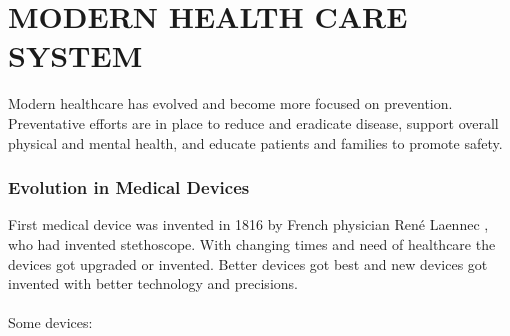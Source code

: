 \documentclass[12pt]{article}
\begin{document}
\section*{MODERN HEALTH CARE SYSTEM}

\large Modern healthcare has evolved and become more focused on prevention. Preventative efforts are in place to reduce and eradicate disease, support overall physical and mental health, and educate patients and families to promote safety. \\

\subsubsection*{\LARGE Evolution  in Medical Devices}
First medical device was invented in 1816 by French physician René Laennec , who had invented stethoscope. With changing times and need of healthcare the devices got upgraded or invented. Better devices got best and new devices got invented with better technology and precisions.\\
\\ Some devices:
\end{document}
